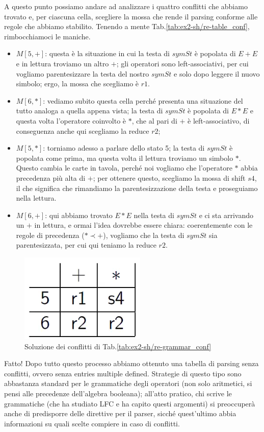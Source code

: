 \documentclass[class=book, crop=false, oneside, 12pt]{standalone}
\begin{document}
A questo punto possiamo andare ad analizzare i quattro conflitti che abbiamo trovato e, per ciascuna cella, scegliere la mossa che rende il parsing conforme alle regole che abbiamo stabilito. Tenendo a mente Tab.\ref{tab:ex2-sh/re-table_conf}, rimbocchiamoci le maniche.
\begin{itemize}
    \item \(M[5, +]\): questa è la situazione in cui la testa di \(symSt\) è popolata di \(E + E\) e in lettura troviamo un altro \(+\); gli operatori sono left-associativi, per cui vogliamo parentesizzare la testa del nostro \(symSt\) e solo dopo leggere il nuovo simbolo; ergo, la mossa che scegliamo è \(r1\).
    \item \(M[6, *]\): vediamo subito questa cella perché presenta una situazione del tutto analoga a quella appena vista;  la testa di \(symSt\) è popolata di \(E * E\) e questa volta l'operatore coinvolto è \(\ast\), che al pari di \(+\) è left-associativo, di conseguenza anche qui scegliamo la reduce \(r2\);
    \item \(M[5, *]\): torniamo adesso a parlare dello stato 5; la testa di \(symSt\) è popolata come prima, ma questa volta il lettura troviamo un simbolo \(\ast\). Questo cambia le carte in tavola, perché noi vogliamo che l'operatore \(\ast\) abbia precedenza più alta di \(+\); per ottenere questo, scegliamo la mossa di shift \(s4\), il che significa che rimandiamo la parentesizzazione della testa e proseguiamo nella lettura.
    \item \(M[6, +]\): qui abbiamo trovato \(E * E\) nella testa di \(symSt\) e ci sta arrivando un \(+\) in lettura, e ormai l'idea dovrebbe essere chiara: coerentemente con le regole di precedenza (\(\ast \prec +\)), vogliamo che la testa di \(symSt\) sia parentesizzata, per cui qui teniamo la reduce \(r2\).
\end{itemize}
\begin{figure}[H]
    \centering
    \includegraphics[width=.6\textwidth]{ex2-sh_re-table_conf_solved.png}
    \caption{Soluzione dei conflitti di Tab.\ref{tab:ex2-sh/re-grammar_conf}}
    \label{tab:ex2-sh/re-table_conf_solved}
\end{figure}
Fatto! Dopo tutto questo processo abbiamo ottenuto una tabella di parsing senza conflitti, ovvero senza entries multiple defined. Strategie di questo tipo sono abbastanza standard per le grammatiche degli operatori (non solo aritmetici, si pensi alle precedenze dell'algebra booleana); all'atto pratico, chi scrive le grammatiche (che ha studiato LFC e ha capito questi argomenti) si preoccuperà anche di predisporre delle direttive per il parser, sicché quest'ultimo abbia informazioni su quali scelte compiere in caso di conflitti.
\end{document}

